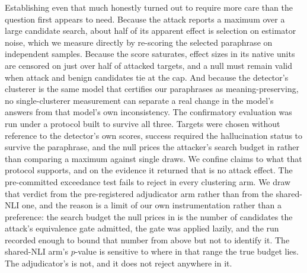 Establishing even that much honestly turned out to require more care than the question first
appears to need. Because the attack reports a maximum over a large candidate search, about half
of its apparent effect is selection on estimator noise, which we measure directly by re-scoring
the selected paraphrase on independent samples. Because the score saturates, effect sizes in
its native units are censored on just over half of attacked targets, and a null must remain
valid when attack and benign candidates tie at the cap. And because the detector's clusterer is
the same model that certifies our paraphrases as meaning-preserving, no single-clusterer
measurement can separate a real change in the model's answers from that model's own
inconsistency. The confirmatory evaluation was run under a protocol built to survive all three.
Targets were chosen without reference to the detector's own scores, success required the
hallucination status to survive the paraphrase, and the null prices the attacker's search
budget in rather than comparing a maximum against single draws. We confine claims to what that
protocol supports, and on the evidence it returned that is no attack effect. The
pre-committed exceedance test fails to reject in every clustering arm. We draw that verdict
from the pre-registered adjudicator arm rather than from the shared-NLI one, and the reason
is a limit of our own instrumentation rather than a preference: the search budget the null
prices in is the number of candidates the attack's equivalence gate admitted, the gate was
applied lazily, and the run recorded enough to bound that number from above but not to
identify it. The shared-NLI arm's $p$-value is sensitive to where in that range the true
budget lies. The adjudicator's is not, and it does not reject anywhere in it.


